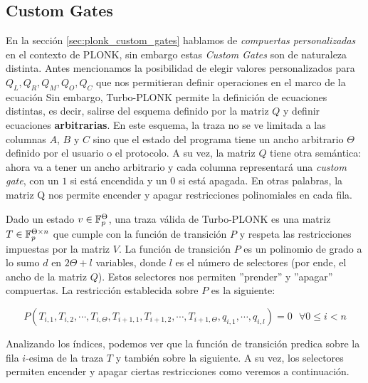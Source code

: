 \subsection{Custom Gates}\label{sec:turbo_plonk_custom_gates}
En la sección \ref{sec:plonk_custom_gates} hablamos de \textit{compuertas personalizadas} en el contexto de PLONK, sin embargo estas \textit{Custom Gates} son de naturaleza distinta. Antes mencionamos la posibilidad de elegir valores personalizados para $Q_L, Q_R, Q_M, Q_O, Q_C$ que nos permitieran definir operaciones en el marco de la ecuación \PlonkFormula
Sin embargo, Turbo-PLONK permite la definición de ecuaciones distintas, es decir, salirse del esquema definido por la matriz $Q$ y definir ecuaciones \textbf{arbitrarias}. En este esquema, la traza no se ve limitada a las columnas $A$, $B$ y $C$ sino que el estado del programa tiene un ancho arbitrario $\Theta$ definido por el usuario o el protocolo. A su vez, la matriz $Q$ tiene otra semántica: ahora va a tener un ancho arbitrario y cada columna representará una \textit{custom gate}, con un $1$ si está encendida y un $0$ si está apagada. En otras palabras, la matriz Q nos permite encender y apagar restricciones polinomiales en cada fila. 

Dado un estado $v \in \mathbb{F}_p^\Theta$, una traza válida de Turbo-PLONK es una matriz $T \in \mathbb{F}_p^{\Theta \times n}$ que cumple con la función de transición $P$ y respeta las restricciones impuestas por la matriz $V$. La función de transición $P$ es un polinomio de grado a lo sumo $d$ en $2\Theta + l$ variables, donde $l$ es el número de selectores (por ende, el ancho de la matriz $Q$). Estos selectores nos permiten ''prender'' y ''apagar'' compuertas. La restricción establecida sobre $P$ es la siguiente:

$$P(T_{i,1}, T_{i,2}, \cdots, T_{i,\Theta}, T_{i+1, 1}, T_{i+1, 2}, \cdots, T_{i+1, \Theta}, q_{i,1}, \cdots, q_{i, l}) = 0 ~~~ \forall 0 \leq i < n$$

Analizando los índices, podemos ver que la función de transición predica sobre la fila $i$-esima de la traza $T$ y también sobre la siguiente. A su vez, los selectores permiten encender y apagar ciertas restricciones como veremos a continuación.

